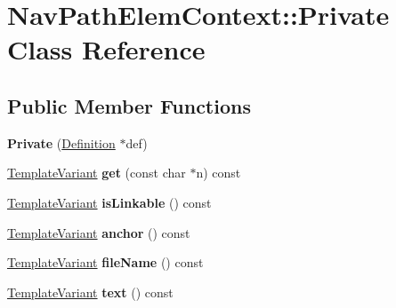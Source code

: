 \hypertarget{class_nav_path_elem_context_1_1_private}{}\section{Nav\+Path\+Elem\+Context\+::Private Class Reference}
\label{class_nav_path_elem_context_1_1_private}
\subsection*{Public Member Functions}
\begin{DoxyCompactItemize}
\item 
\mbox{\label{class_nav_path_elem_context_1_1_private_ae57e3fc2a7a42119c29b98433c16b27a}} 
{\bfseries Private} (\mbox{\hyperlink{class_definition}{Definition}} $\ast$def)
\item 
\mbox{\label{class_nav_path_elem_context_1_1_private_abb50d888c5969d50d3a11de2b887e375}} 
\mbox{\hyperlink{class_template_variant}{Template\+Variant}} {\bfseries get} (const char $\ast$n) const
\item 
\mbox{\label{class_nav_path_elem_context_1_1_private_a6d7d703b821c37a7079d7e26b3f30dd2}} 
\mbox{\hyperlink{class_template_variant}{Template\+Variant}} {\bfseries is\+Linkable} () const
\item 
\mbox{\label{class_nav_path_elem_context_1_1_private_a23ffe5d859e0a157f18c25767b6457e4}} 
\mbox{\hyperlink{class_template_variant}{Template\+Variant}} {\bfseries anchor} () const
\item 
\mbox{\label{class_nav_path_elem_context_1_1_private_ae2e9c52dc5b827cb0d9f41438ae4d730}} 
\mbox{\hyperlink{class_template_variant}{Template\+Variant}} {\bfseries file\+Name} () const
\item 
\mbox{\label{class_nav_path_elem_context_1_1_private_a914318fdfd0a25a8ced2e3bfadd151da}} 
\mbox{\hyperlink{class_template_variant}{Template\+Variant}} {\bfseries text} () const
\item 
\mbox{\label{class_nav_path_elem_context_1_1_private_ad166cb449718f8178cbb141ef3ecea5d}} 

\end{DoxyCompactItemize}
